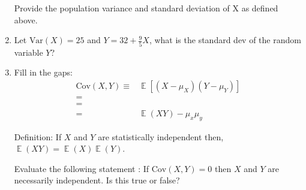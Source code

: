 \documentclass[12pt]{article}
\begin{document}
\begin{enumerate}[1)]
\bigskip

\bigskip

Provide the population variance and standard deviation of X as defined above.  

\newpage

\item Let $\text{Var}(X)=25$ and $Y=32+\frac{9}{5}X$, what is the standard dev of the random variable $Y$? 

\bigskip

\bigskip

\bigskip

\bigskip

\bigskip

\bigskip

\bigskip

\bigskip

\item Fill in the gaps:
\begin{align*}
\text{Cov}(X,Y) \equiv & \mathop{\mathbb{E}} \left[ (X - \mu_X) (Y - \mu_Y) \right]\\
=&\\
=&\\
=& \mathop{\mathbb{E}} (XY) - \mu_x \mu_y
\end{align*}

Definition: If $X$ and $Y$ are statistically independent then, $\mathop{\mathbb{E}}(XY) = \mathop{\mathbb{E}}(X)\mathop{\mathbb{E}}(Y)$.

Evaluate the following statement : If $\text{Cov}(X,Y) = 0$ then $X$ and $Y$ are necessarily independent. Is this true or false? 

\bigskip

\bigskip

\bigskip

\bigskip





\end{enumerate}

\bigskip
\end{document}
